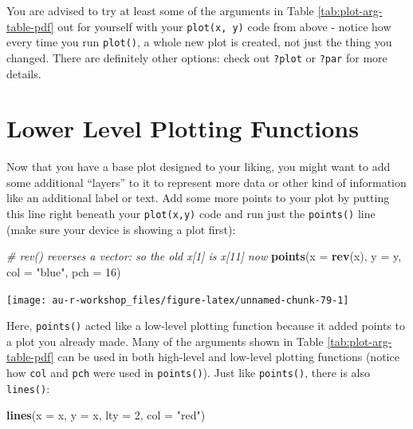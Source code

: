 \documentclass[]{book}
\newenvironment{Shaded}{\begin{snugshade}}{\end{snugshade}}
\newcommand{\KeywordTok}[1]{\textcolor[rgb]{0.13,0.29,0.53}{\textbf{#1}}}
\newcommand{\DataTypeTok}[1]{\textcolor[rgb]{0.13,0.29,0.53}{#1}}
\newcommand{\DecValTok}[1]{\textcolor[rgb]{0.00,0.00,0.81}{#1}}
\newcommand{\StringTok}[1]{\textcolor[rgb]{0.31,0.60,0.02}{#1}}
\newcommand{\CommentTok}[1]{\textcolor[rgb]{0.56,0.35,0.01}{\textit{#1}}}
\newcommand{\NormalTok}[1]{#1}
\theoremstyle{definition}
\theoremstyle{definition}
\theoremstyle{definition}
\theoremstyle{remark}
\begin{document}
You are advised to try at least some of the arguments in Table
\ref{tab:plot-arg-table-pdf} out for yourself with your
\texttt{plot(x,\ y)} code from above - notice how every time you run
\texttt{plot()}, a whole new plot is created, not just the thing you
changed. There are definitely other options: check out \texttt{?plot} or
\texttt{?par} for more details.

\section{Lower Level Plotting
Functions}\label{lower-level-plotting-functions}

Now that you have a base plot designed to your liking, you might want to
add some additional ``layers'' to it to represent more data or other
kind of information like an additional label or text. Add some more
points to your plot by putting this line right beneath your
\texttt{plot(x,y)} code and run just the \texttt{points()} line (make
sure your device is showing a plot first):

\begin{Shaded}
\begin{Highlighting}[]
\CommentTok{# rev() reverses a vector: so the old x[1] is x[11] now}
\KeywordTok{points}\NormalTok{(}\DataTypeTok{x =} \KeywordTok{rev}\NormalTok{(x), }\DataTypeTok{y =}\NormalTok{ y, }\DataTypeTok{col =} \StringTok{"blue"}\NormalTok{, }\DataTypeTok{pch =} \DecValTok{16}\NormalTok{)}
\end{Highlighting}
\end{Shaded}

\begin{center}\texttt{[image: au-r-workshop\_files/figure-latex/unnamed-chunk-79-1]} \end{center}

Here, \texttt{points()} acted like a low-level plotting function because
it added points to a plot you already made. Many of the arguments shown
in Table \ref{tab:plot-arg-table-pdf} can be used in both high-level and
low-level plotting functions (notice how \texttt{col} and \texttt{pch}
were used in \texttt{points()}). Just like \texttt{points()}, there is
also \texttt{lines()}:

\begin{Shaded}
\begin{Highlighting}[]
\KeywordTok{lines}\NormalTok{(}\DataTypeTok{x =}\NormalTok{ x, }\DataTypeTok{y =}\NormalTok{ x, }\DataTypeTok{lty =} \DecValTok{2}\NormalTok{, }\DataTypeTok{col =} \StringTok{"red"}\NormalTok{)}
\end{Highlighting}
\end{Shaded}
\end{document}
